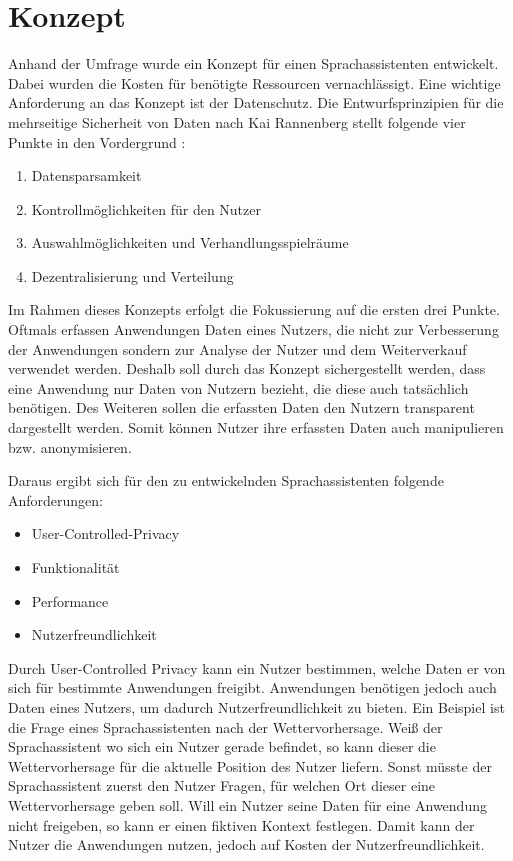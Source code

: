 \section{Konzept}\label{sec:konzept}
Anhand der Umfrage wurde ein Konzept für einen Sprachassistenten entwickelt. Dabei wurden die Kosten für benötigte Ressourcen vernachlässigt. Eine wichtige Anforderung an das Konzept ist der Datenschutz. Die Entwurfsprinzipien für die mehrseitige Sicherheit von Daten nach Kai Rannenberg stellt folgende vier Punkte in den Vordergrund \cite{kairannenberg}:

\begin{enumerate}
	\item Datensparsamkeit
	\item Kontrollmöglichkeiten für den Nutzer 
	\item Auswahlmöglichkeiten und Verhandlungsspielräume 
	\item Dezentralisierung und Verteilung
\end{enumerate} 

Im Rahmen dieses Konzepts erfolgt die Fokussierung auf die ersten drei Punkte. Oftmals erfassen Anwendungen Daten eines Nutzers, die nicht zur Verbesserung der Anwendungen sondern zur Analyse der Nutzer und dem Weiterverkauf verwendet werden. Deshalb soll durch das Konzept sichergestellt werden, dass eine Anwendung nur Daten von Nutzern bezieht, die diese auch tatsächlich benötigen. Des Weiteren sollen die erfassten Daten den Nutzern transparent dargestellt werden. Somit können Nutzer ihre erfassten Daten auch manipulieren bzw. anonymisieren. 

Daraus ergibt sich für den zu entwickelnden Sprachassistenten folgende Anforderungen:
\begin{itemize}
	\item User-Controlled-Privacy
	\item Funktionalität
	\item Performance
	\item Nutzerfreundlichkeit	
\end{itemize}

Durch User-Controlled Privacy kann ein Nutzer bestimmen, welche Daten er von sich für bestimmte Anwendungen freigibt. Anwendungen benötigen jedoch auch Daten eines Nutzers, um dadurch Nutzerfreundlichkeit zu bieten. Ein Beispiel ist die Frage eines Sprachassistenten nach der Wettervorhersage. Weiß der Sprachassistent wo sich ein Nutzer gerade befindet, so kann dieser die Wettervorhersage für die aktuelle Position des Nutzer liefern. Sonst müsste der Sprachassistent zuerst den Nutzer Fragen, für welchen Ort dieser eine Wettervorhersage geben soll. Will ein Nutzer seine Daten für eine Anwendung nicht freigeben, so kann er einen fiktiven Kontext festlegen. Damit kann der Nutzer die Anwendungen nutzen, jedoch auf Kosten der Nutzerfreundlichkeit.

